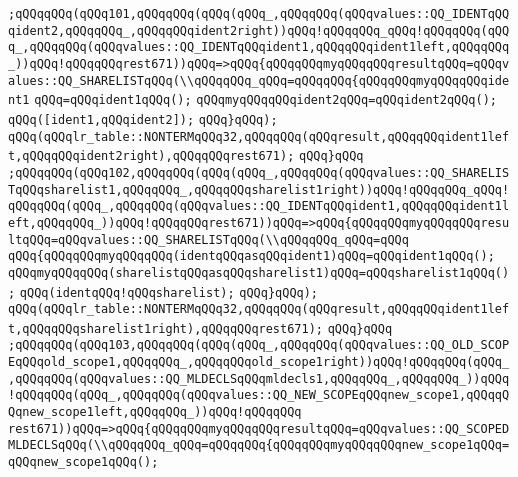 \verb|;qQQqqQQq(qQQq101,qQQqqQQq(qQQq(qQQq_,qQQqqQQq(qQQqvalues::QQ_IDENTqQQqident2,qQQqqQQq_,qQQqqQQqident2right))qQQq!qQQqqQQq_qQQq!qQQqqQQq(qQQq_,qQQqqQQq(qQQqvalues::QQ_IDENTqQQqident1,qQQqqQQqident1left,qQQqqQQq_))qQQq!qQQqqQQqrest671))qQQq=>qQQq{qQQqqQQqmyqQQqqQQqresultqQQq=qQQqvalues::QQ_SHARELISTqQQq(\\qQQqqQQq_qQQq=qQQqqQQq{qQQqqQQqmyqQQqqQQqident1|\newline
\verb|qQQq=qQQqident1qQQq();|\newline
\verb|qQQqmyqQQqqQQqident2qQQq=qQQqident2qQQq();|\newline
\verb|qQQq([ident1,qQQqident2]);|\newline
\verb|qQQq}qQQq);|\newline
\verb|qQQq(qQQqlr_table::NONTERMqQQq32,qQQqqQQq(qQQqresult,qQQqqQQqident1left,qQQqqQQqident2right),qQQqqQQqrest671);|\newline
\verb|qQQq}qQQq|\newline
\verb|;qQQqqQQq(qQQq102,qQQqqQQq(qQQq(qQQq_,qQQqqQQq(qQQqvalues::QQ_SHARELISTqQQqsharelist1,qQQqqQQq_,qQQqqQQqsharelist1right))qQQq!qQQqqQQq_qQQq!qQQqqQQq(qQQq_,qQQqqQQq(qQQqvalues::QQ_IDENTqQQqident1,qQQqqQQqident1left,qQQqqQQq_))qQQq!qQQqqQQqrest671))qQQq=>qQQq{qQQqqQQqmyqQQqqQQqresultqQQq=qQQqvalues::QQ_SHARELISTqQQq(\\qQQqqQQq_qQQq=qQQq|\newline
\verb|qQQq{qQQqqQQqmyqQQqqQQq(identqQQqasqQQqident1)qQQq=qQQqident1qQQq();|\newline
\verb|qQQqmyqQQqqQQq(sharelistqQQqasqQQqsharelist1)qQQq=qQQqsharelist1qQQq();|\newline
\verb|qQQq(identqQQq!qQQqsharelist);|\newline
\verb|qQQq}qQQq);|\newline
\verb|qQQq(qQQqlr_table::NONTERMqQQq32,qQQqqQQq(qQQqresult,qQQqqQQqident1left,qQQqqQQqsharelist1right),qQQqqQQqrest671);|\newline
\verb|qQQq}qQQq|\newline
\verb|;qQQqqQQq(qQQq103,qQQqqQQq(qQQq(qQQq_,qQQqqQQq(qQQqvalues::QQ_OLD_SCOPEqQQqold_scope1,qQQqqQQq_,qQQqqQQqold_scope1right))qQQq!qQQqqQQq(qQQq_,qQQqqQQq(qQQqvalues::QQ_MLDECLSqQQqmldecls1,qQQqqQQq_,qQQqqQQq_))qQQq!qQQqqQQq(qQQq_,qQQqqQQq(qQQqvalues::QQ_NEW_SCOPEqQQqnew_scope1,qQQqqQQqnew_scope1left,qQQqqQQq_))qQQq!qQQqqQQq|\newline
\verb|rest671))qQQq=>qQQq{qQQqqQQqmyqQQqqQQqresultqQQq=qQQqvalues::QQ_SCOPEDMLDECLSqQQq(\\qQQqqQQq_qQQq=qQQqqQQq{qQQqqQQqmyqQQqqQQqnew_scope1qQQq=qQQqnew_scope1qQQq();|\newline
